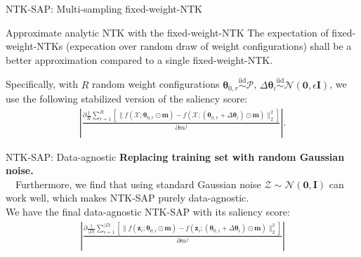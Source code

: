 \documentclass{beamer}
\begin{document}
\begin{frame}{NTK-SAP: Multi-sampling fixed-weight-NTK}

\begin{alertblock}{Approximate analytic NTK with the fixed-weight-NTK}
    The expectation of fixed-weight-NTKs (expecation over random draw of weight configurations) shall be a better approximation compared to a single fixed-weight-NTK. 
\end{alertblock}


Specifically, with $R$ random weight configurations $\boldsymbol{\theta}_{0,r} \overset{\mathrm{iid}}{\sim} \mathcal{P}$, $\Delta \boldsymbol{\theta}_{i} \overset{\mathrm{iid}}{\sim} \mathcal{N}(\textbf{0},\epsilon\textbf{I})$, we use the following stabilized version of the saliency score: 
\begin{align*}
    \left|\frac{\partial \frac{1}{R} \sum_{r=1}^R \left[\|f(\mathcal{X};\boldsymbol{\theta}_{0,r}\odot \textbf{m})-f(\mathcal{X};(\boldsymbol{\theta}_{0,r}+\Delta\boldsymbol{\theta}_i)\odot \textbf{m})\|_2^2\right]}{\partial m^j}\right|. 
\end{align*} 

\end{frame}


\begin{frame}{NTK-SAP: Data-agnostic}
\textbf{Replacing training set with random Gaussian noise.} \\~\
Furthermore, we find that using standard Gaussian noise $\mathcal{Z}\sim \mathcal{N}(\textbf{0},\textbf{I})$ can work well, which makes NTK-SAP purely data-agnostic. \\
We have the final data-agnostic NTK-SAP with its saliency score:
\begin{align*}
     \left|\frac{\partial \frac{1}{|D|} \sum_{i=1}^{|D|} \left[\|f(\mathbf{z}_{i};\boldsymbol{\theta}_{0,i}\odot \textbf{m})-f(\mathbf{z}_{i};(\boldsymbol{\theta}_{0,i}+\Delta\boldsymbol{\theta}_{i})\odot \textbf{m})\|_2^2\right]}{\partial m^j}\right| \label{eq:multi-init-final}
\end{align*}     
\end{frame}
\end{document}

